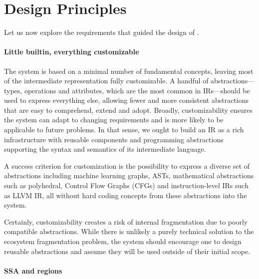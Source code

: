 \section{Design Principles}\label{sec:design}


Let us now explore the requirements that guided the design of \MLIR.

\paragraph{Little builtin, everything customizable}

The system is based on a minimal number of fundamental concepts, leaving
most of the intermediate representation fully customizable. A handful of
abstractions---types, operations and attributes, which are the most common in
IRs---should be used to express everything else,
allowing fewer and more consistent abstractions that are easy to comprehend,
extend and adopt. Broadly, customizability ensures the system can adapt to
changing requirements and is more likely to be applicable to future problems.
In that sense, we ought to build an IR as a rich infrastructure with reusable components and programming abstractions supporting the syntax and semantics of its intermediate language.

A success criterion for customization is the possibility to express a diverse
set of abstractions including machine learning graphs, ASTs, mathematical
abstractions such as polyhedral, Control Flow Graphs (CFGs) and instruction-level IRs such as LLVM
IR, all without hard coding concepts from these abstractions into the system.

Certainly, customizability creates a risk of internal fragmentation due to
poorly compatible abstractions. While there is unlikely a purely technical
solution to the ecosystem fragmentation problem, the system should encourage
one to design reusable abstractions and assume they will be used outside of
their initial scope.

\paragraph{SSA and regions}

